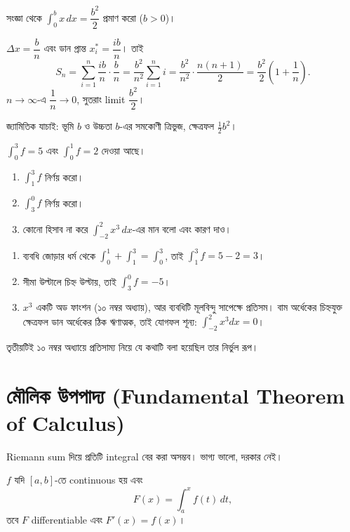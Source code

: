 \documentclass[11pt]{article}
\begin{document}
 সংজ্ঞা থেকে $\int_{0}^{b} x\,dx = \dfrac{b^{2}}{2}$ প্রমাণ করো
($b > 0$)।

\begin{sol}
$\Delta x = \dfrac{b}{n}$ এবং ডান প্রান্ত $x_{i}^{*} = \dfrac{ib}{n}$। তাই
\[
  S_{n} = \sum_{i=1}^{n} \frac{ib}{n} \cdot \frac{b}{n}
        = \frac{b^{2}}{n^{2}}\sum_{i=1}^{n} i
        = \frac{b^{2}}{n^{2}} \cdot \frac{n(n+1)}{2}
        = \frac{b^{2}}{2}\left( 1 + \frac{1}{n} \right) .
\]
$n \to \infty$-এ $\dfrac{1}{n} \to 0$, সুতরাং limit $\dfrac{b^{2}}{2}$।

জ্যামিতিক যাচাই: ভূমি $b$ ও উচ্চতা $b$-এর সমকোণী ত্রিভুজ, ক্ষেত্রফল
$\tfrac{1}{2}b^{2}$।
\end{sol}

 $\int_{0}^{3}f = 5$ এবং $\int_{0}^{1}f = 2$ দেওয়া আছে।
\begin{enumerate}
  \item $\int_{1}^{3}f$ নির্ণয় করো।
  \item $\int_{3}^{0}f$ নির্ণয় করো।
  \item কোনো হিসাব না করে $\int_{-2}^{2} x^{3}\,dx$-এর মান বলো এবং কারণ দাও।
\end{enumerate}

\begin{sol}
\begin{enumerate}
  \item ব্যবধি জোড়ার ধর্ম থেকে $\int_{0}^{1} + \int_{1}^{3} =
        \int_{0}^{3}$, তাই $\int_{1}^{3}f = 5 - 2 = 3$।
  \item সীমা উল্টালে চিহ্ন উল্টায়, তাই $\int_{3}^{0}f = -5$।
  \item $x^{3}$ একটি অড ফাংশন (১০ নম্বর অধ্যায়), আর ব্যবধিটি
        মূলবিন্দু সাপেক্ষে প্রতিসম। বাম অর্ধেকের চিহ্নযুক্ত ক্ষেত্রফল ডান
        অর্ধেকের ঠিক ঋণাত্মক, তাই যোগফল শূন্য: $\int_{-2}^{2}x^{3}dx = 0$।
\end{enumerate}
তৃতীয়টিই ১০ নম্বর অধ্যায়ে প্রতিসাম্য নিয়ে যে কথাটি বলা হয়েছিল তার
নির্ভুল রূপ।
\end{sol}

\section{মৌলিক উপপাদ্য (Fundamental Theorem of Calculus)}

Riemann sum দিয়ে প্রতিটি integral বের করা অসম্ভব। ভাগ্য ভালো, দরকার নেই।

\begin{idea}
$f$ যদি $[a,b]$-তে continuous হয় এবং
\[
  F(x) = \int_{a}^{x} f(t)\,dt ,
\]
তবে $F$ differentiable এবং $F'(x) = f(x)$।
\end{idea}
\end{document}
